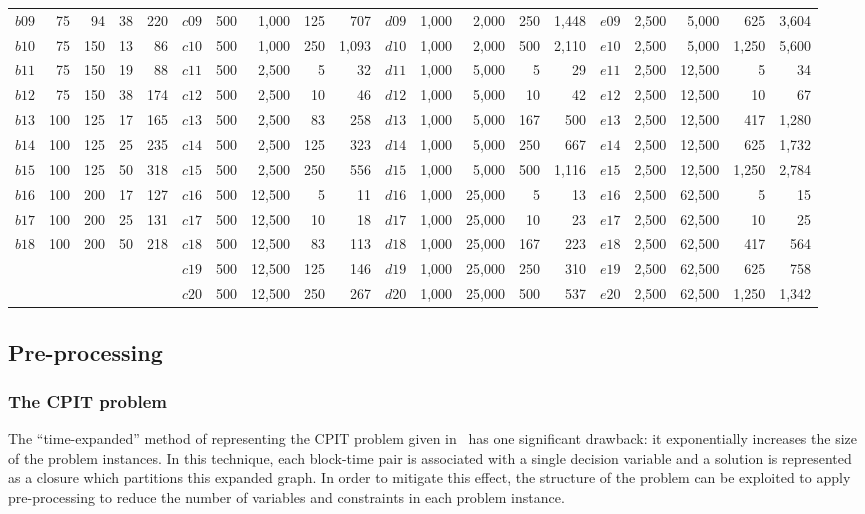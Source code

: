 \documentclass[journal]{IEEEtran}
\begin{document}
\begin{table}[h]
\begin{adjustbox}{width=\textwidth}
\begin{tabular}{lrrrr|lrrrr|lrrrr|lrrrr}
$b09$ & 75 & 94 & 38 & 220& $c09$ & 500 & 1,000 & 125 & 707&  $d09$ & 1,000 & 2,000 & 250 & 1,448& $e09$ & 2,500 & 5,000 & 625 & 3,604\\
$b10$ & 75 & 150 & 13 & 86& $c10$ & 500 & 1,000 & 250 &1,093&  $d10$ & 1,000 & 2,000 & 500 & 2,110& $e10$ & 2,500 & 5,000 & 1,250 &5,600\\
$b11$ & 75 & 150 & 19 & 88& $c11$ & 500 & 2,500 & 5 &32&  $d11$ & 1,000 & 5,000 & 5 & 29& $e11$ & 2,500 & 12,500 & 5 &34\\
$b12$ & 75 & 150 & 38 & 174& $c12$ & 500 & 2,500 & 10 & 46&  $d12$ & 1,000 & 5,000 & 10 & 42& $e12$ & 2,500 & 12,500 & 10 & 67\\
$b13$ & 100 & 125 & 17 & 165& $c13$ & 500 & 2,500 & 83 & 258&  $d13$ & 1,000 & 5,000 & 167 & 500& $e13$ & 2,500 & 12,500 & 417 & 1,280\\
$b14$ & 100 & 125 & 25 & 235& $c14$ & 500 & 2,500 & 125 & 323&  $d14$ & 1,000 & 5,000 & 250 & 667& $e14$ & 2,500 & 12,500 & 625 & 1,732\\
$b15$ & 100 & 125 & 50 & 318& $c15$ & 500 & 2,500 & 250 & 556&  $d15$ & 1,000 & 5,000 & 500 & 1,116& $e15$ & 2,500 & 12,500 & 1,250 & 2,784\\
$b16$ & 100 & 200 & 17 & 127& $c16$ & 500 & 12,500 & 5 & 11&  $d16$ & 1,000 & 25,000 & 5 & 13& $e16$ & 2,500 & 62,500 & 5 & 15\\
$b17$ & 100 & 200 & 25 & 131& $c17$ & 500 & 12,500 & 10 & 18&  $d17$ & 1,000 & 25,000 & 10 & 23& $e17$ & 2,500 & 62,500 & 10 & 25\\
$b18$ & 100 & 200 & 50 & 218& $c18$ & 500 & 12,500 & 83 & 113&  $d18$ & 1,000 & 25,000 & 167 & 223& $e18$ & 2,500 & 62,500 & 417 & 564\\
&&&&& $c19$ & 500 & 12,500 & 125 & 146 &$d19$ & 1,000 & 25,000 & 250 & 310& $e19$ & 2,500 & 62,500 & 625 & 758\\
&&&&& $c20$ & 500 & 12,500 & 250 & 267 &$d20$ & 1,000 & 25,000 & 500 & 537& $e20$ & 2,500 & 62,500 & 1,250 & 1,342\\
\bottomrule
\end{tabular}
\end{adjustbox}
\end{table}

\subsection{Pre-processing}
\subsubsection*{The CPIT problem}
The ``time-expanded'' method of representing the CPIT problem given in~\cite{Kenny:2017} has one significant drawback: it exponentially increases the size of the problem instances. In this technique, each block-time pair is associated with a single decision variable and a solution is represented as a closure which partitions this expanded graph. In order to mitigate this effect, the structure of the problem can be exploited to apply pre-processing to reduce the number of variables and constraints in each problem instance.
\end{document}
